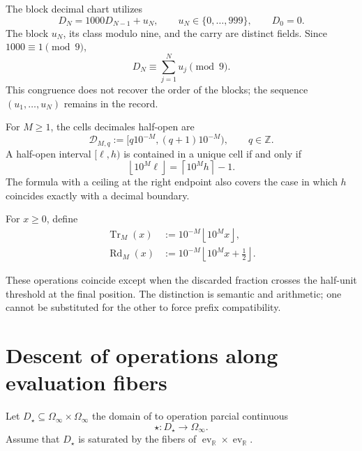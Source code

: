 The block decimal chart utilizes
\begin{equation}
 D_N=1000D_{N-1}+u_N,
 \qquad
 u_N\in\{0,\ldots,999\},
 \qquad D_0=0.
 \label{p12-83-c18-s1:eq:concatenacion-base-mil-u024}
\end{equation}
The block \(u_N\), its class modulo nine, and the carry are distinct fields.
Since \(1000\equiv1\pmod9\),
\begin{equation}
 D_N\equiv\sum_{j=1}^{N}u_j\pmod9.
 \label{p12-83-c18-s1:eq:base-mil-compatible-mod9-u024}
\end{equation}
This congruence does not recover the order of the blocks; the sequence
\((u_1,\ldots,u_N)\) remains in the record.

For \(M\geq1\), the cells decimales half-open are
\begin{equation}
 \mathcal D_{M,q}
 :=[q10^{-M},(q+1)10^{-M}),
 \qquad q\in\mathbb Z.
 \label{p12-83-c18-s1:eq:celda-decimal-semiabierta-u024}
\end{equation}
A half-open interval \([\ell,h)\) is contained in a unique cell if and only if
\begin{equation}
 \left\lfloor10^M\ell\right\rfloor
 =\left\lceil10^Mh\right\rceil-1.
 \label{p12-83-c18-s1:eq:criterio-exacto-celda-decimal-u024}
\end{equation}
The formula with a ceiling at the right endpoint also covers the case in which
\(h\) coincides exactly with a decimal boundary.

\begin{definition}
For \(x\geq0\), define
\begin{align}
 \operatorname{Tr}_M(x)
 &:=10^{-M}\left\lfloor10^Mx\right\rfloor,
 \label{p12-83-c18-s1:eq:truncamiento-decimal-u024}\\
 \operatorname{Rd}_M(x)
 &:=10^{-M}\left\lfloor10^Mx+\frac12\right\rfloor.
 \label{p12-83-c18-s1:eq:redondeo-decimal-u024}
\end{align}
\end{definition}
These operations coincide except when the discarded fraction crosses the
half-unit threshold at the final position. The distinction is semantic and
arithmetic; one cannot be substituted for the other to force prefix
compatibility.

\section{Descent of operations along evaluation fibers}

Let \(D_\star\subseteq\Omega_\infty\times\Omega_\infty\) the domain of to
operation parcial continuous
\begin{equation}
 \star:D_\star\longrightarrow\Omega_\infty.
 \label{p12-83-c18-s1:eq:operacion-historias-u024}
\end{equation}
Assume that \(D_\star\) is saturated by the fibers of
\(\operatorname{ev}_{\mathbb R}\times\operatorname{ev}_{\mathbb R}\).

